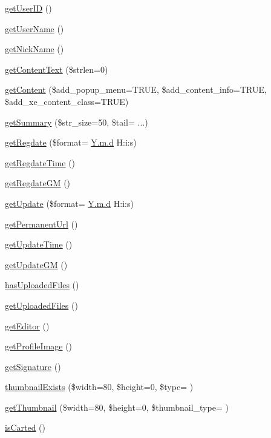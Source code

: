 \begin{DoxyCompactItemize}
\hyperlink{classcommentItem_a5c793e6542e731da5d465c35c77b42fd}{get\+User\+ID} ()
\item 
\hyperlink{classcommentItem_a1c35032d37e80ad5018a02787f0091fe}{get\+User\+Name} ()
\item 
\hyperlink{classcommentItem_a097673677cd1c461040cbc9275b7fca9}{get\+Nick\+Name} ()
\item 
\hyperlink{classcommentItem_a5bd758e385068bff00ffc35a0737ff72}{get\+Content\+Text} (\$strlen=0)
\item 
\hyperlink{classcommentItem_afae7151c28cc9066f9c40a010597b25a}{get\+Content} (\$add\+\_\+popup\+\_\+menu=T\+R\+UE, \$add\+\_\+content\+\_\+info=T\+R\+UE, \$add\+\_\+xe\+\_\+content\+\_\+class=T\+R\+UE)
\item 
\hyperlink{classcommentItem_aabe11142b19d831c5e3120e48bb169f7}{get\+Summary} (\$str\+\_\+size=50, \$tail= \textquotesingle{}...\textquotesingle{})
\item 
\hyperlink{classcommentItem_acae004be4282c96181e79cc0f3b3adfa}{get\+Regdate} (\$format= \textquotesingle{}\hyperlink{xpresseditor_8min_8js_aa27188e30a5d2270a230edf44af69623}{Y.\+m.\+d} H\+:i\+:s\textquotesingle{})
\item 
\hyperlink{classcommentItem_adb5754f10a245c54a0beb4f6fb22f0e3}{get\+Regdate\+Time} ()
\item 
\hyperlink{classcommentItem_ae5f0203691b6d16a2d99ae40d67adb3f}{get\+Regdate\+GM} ()
\item 
\hyperlink{classcommentItem_aa7a413ef04f4c64c779a8bb119a5c214}{get\+Update} (\$format= \textquotesingle{}\hyperlink{xpresseditor_8min_8js_aa27188e30a5d2270a230edf44af69623}{Y.\+m.\+d} H\+:i\+:s\textquotesingle{})
\item 
\hyperlink{classcommentItem_adc6e6a36fd7c02a2f0fecc8a22f9b13b}{get\+Permanent\+Url} ()
\item 
\hyperlink{classcommentItem_a59d0264c1b6842c6a0dfa21a6dfe1edb}{get\+Update\+Time} ()
\item 
\hyperlink{classcommentItem_aab0135e2edd37a47cc390da9b4c79dfa}{get\+Update\+GM} ()
\item 
\hyperlink{classcommentItem_abe1774ffe4e8c0f5c14822c5698433da}{has\+Uploaded\+Files} ()
\item 
\hyperlink{classcommentItem_aaa9c1ef5cfd0ce69fd83d8d980360ee5}{get\+Uploaded\+Files} ()
\item 
\hyperlink{classcommentItem_aa27b1c1916b9df510c495655af07bfdf}{get\+Editor} ()
\item 
\hyperlink{classcommentItem_a9baa56f4aa9515c433494778e75c9e85}{get\+Profile\+Image} ()
\item 
\hyperlink{classcommentItem_a97eea3e5359c0ffe84db781d5e5fbff6}{get\+Signature} ()
\item 
\hyperlink{classcommentItem_a1523ec4128cf464d13ca1fb1c2078a0f}{thumbnail\+Exists} (\$width=80, \$height=0, \$type= \textquotesingle{}\textquotesingle{})
\item 
\hyperlink{classcommentItem_a9ba96d0703304547c3f494403a86e522}{get\+Thumbnail} (\$width=80, \$height=0, \$thumbnail\+\_\+type= \textquotesingle{}\textquotesingle{})
\item 
\hyperlink{classcommentItem_aee548a05480bd060de454017aa8be318}{is\+Carted} ()
\end{DoxyCompactItemize}
